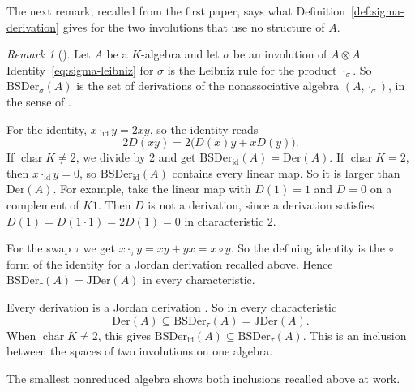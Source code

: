 \documentclass[]{interact}
\theoremstyle{plain}
\theoremstyle{definition}
\theoremstyle{remark}
\newtheorem{remark}[theorem]{Remark}
\newcommand{\Der}{\mathrm{Der}}
\newcommand{\JDer}{\mathrm{JDer}}
\newcommand{\BSDer}{\mathrm{BSDer}}
\begin{document}
The next remark, recalled from the first paper, says what Definition~\ref{def:sigma-derivation} gives for the two involutions that use no structure of $A$.

\begin{remark}[{\cite[Remark 2.4]{Adrabi2026a}}]\label{rem:sigma-derivation-classification}
Let $A$ be a $K$-algebra and let $\sigma$ be an involution of $A \otimes A$.
Identity~\eqref{eq:sigma-leibniz} for $\sigma$ is the Leibniz rule for the product $\cdot_\sigma$.
So $\BSDer_\sigma(A)$ is the set of derivations of the nonassociative algebra $(A, \cdot_\sigma)$, in the sense of \citet[Part I]{Jacobson1937}.

For the identity, $x \cdot_{\mathrm{id}} y = 2xy$, so the identity reads
\[
2D(xy) = 2\bigl(D(x)y + xD(y)\bigr).
\]
If $\operatorname{char} K \neq 2$, we divide by $2$ and get $\BSDer_{\mathrm{id}}(A) = \Der(A)$.
If $\operatorname{char} K = 2$, then $x \cdot_{\mathrm{id}} y = 0$, so $\BSDer_{\mathrm{id}}(A)$ contains every linear map.
So it is larger than $\Der(A)$.
For example, take the linear map with $D(1) = 1$ and $D = 0$ on a complement of $K1$.
Then $D$ is not a derivation, since a derivation satisfies $D(1) = D(1 \cdot 1) = 2D(1) = 0$ in characteristic $2$.

For the swap $\tau$ we get $x \cdot_\tau y = xy + yx = x \circ y$.
So the defining identity is the $\circ$ form of the identity for a Jordan derivation recalled above.
Hence $\BSDer_\tau(A) = \JDer(A)$ in every characteristic.

Every derivation is a Jordan derivation \citep[p.~1003]{Bresar1988}.
So in every characteristic
\[
\Der(A) \subseteq \BSDer_\tau(A) = \JDer(A).
\]
When $\operatorname{char} K \neq 2$, this gives $\BSDer_{\mathrm{id}}(A) \subseteq \BSDer_\tau(A)$.
This is an inclusion between the spaces of two involutions on one algebra. %
\end{remark}

The smallest nonreduced algebra shows both inclusions recalled above at work.
\end{document}
